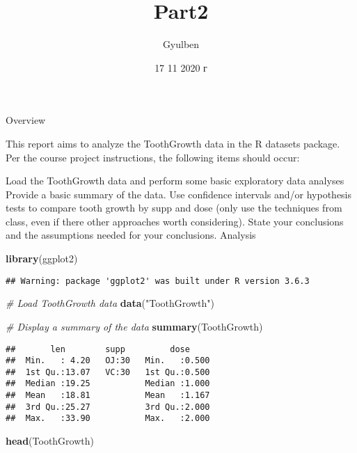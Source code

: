 \documentclass[
]{article}
\title{Part2}
\author{Gyulben}
\date{17 11 2020 г}
\newenvironment{Shaded}{\begin{snugshade}}{\end{snugshade}}
\newcommand{\CommentTok}[1]{\textcolor[rgb]{0.56,0.35,0.01}{\textit{#1}}}
\newcommand{\KeywordTok}[1]{\textcolor[rgb]{0.13,0.29,0.53}{\textbf{#1}}}
\newcommand{\NormalTok}[1]{#1}
\newcommand{\StringTok}[1]{\textcolor[rgb]{0.31,0.60,0.02}{#1}}
\begin{document}
\maketitle

Overview

This report aims to analyze the ToothGrowth data in the R datasets
package. Per the course project instructions, the following items should
occur:

Load the ToothGrowth data and perform some basic exploratory data
analyses Provide a basic summary of the data. Use confidence intervals
and/or hypothesis tests to compare tooth growth by supp and dose (only
use the techniques from class, even if there other approaches worth
considering). State your conclusions and the assumptions needed for your
conclusions. Analysis

\begin{Shaded}
\begin{Highlighting}[]
\KeywordTok{library}\NormalTok{(ggplot2)}
\end{Highlighting}
\end{Shaded}

\begin{verbatim}
## Warning: package 'ggplot2' was built under R version 3.6.3
\end{verbatim}

\begin{Shaded}
\begin{Highlighting}[]
\CommentTok{# Load ToothGrowth data}
\KeywordTok{data}\NormalTok{(}\StringTok{"ToothGrowth"}\NormalTok{)}

\CommentTok{# Display a summary of the data}
\KeywordTok{summary}\NormalTok{(ToothGrowth)}
\end{Highlighting}
\end{Shaded}

\begin{verbatim}
##       len        supp         dose      
##  Min.   : 4.20   OJ:30   Min.   :0.500  
##  1st Qu.:13.07   VC:30   1st Qu.:0.500  
##  Median :19.25           Median :1.000  
##  Mean   :18.81           Mean   :1.167  
##  3rd Qu.:25.27           3rd Qu.:2.000  
##  Max.   :33.90           Max.   :2.000
\end{verbatim}

\begin{Shaded}
\begin{Highlighting}[]
\KeywordTok{head}\NormalTok{(ToothGrowth)}
\end{Highlighting}
\end{Shaded}
\end{document}
